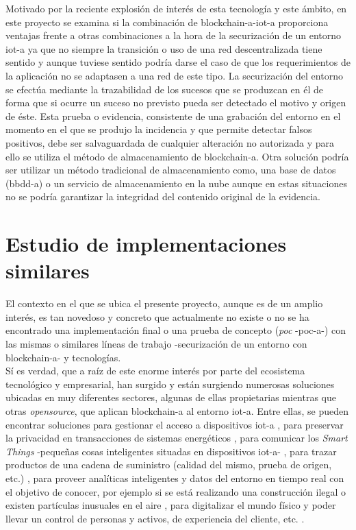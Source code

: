 \documentclass[12pt,a4paper, twoside]{report}
\begin{document}
	Motivado por la reciente explosión de interés de esta tecnología y este ámbito, en este proyecto se examina si la combinación de \gls{blockchain-a}-\gls{iot-a} proporciona ventajas frente a otras combinaciones a la hora de la securización de un entorno \gls{iot-a} ya que no siempre la transición o uso de una red descentralizada tiene sentido y aunque tuviese sentido podría darse el caso de que los requerimientos de la aplicación no se adaptasen a una red de este tipo. La securización del entorno se efectúa mediante la trazabilidad de los sucesos que se produzcan en él de forma que si ocurre un suceso no previsto pueda ser detectado el motivo y origen de éste. Esta prueba o evidencia, consistente de una grabación del entorno en el momento en el que se produjo la incidencia y que permite detectar falsos positivos, debe ser salvaguardada de cualquier alteración no autorizada y para ello se utiliza el método de almacenamiento de \gls{blockchain-a}. Otra solución podría ser utilizar un método tradicional de almacenamiento como, una base de datos (\gls{bbdd-a}) o un servicio de almacenamiento en la nube aunque en estas situaciones no se podría garantizar la integridad del contenido original de la evidencia.
	
	\section{Estudio de implementaciones similares}
	
	El contexto en el que se ubica el presente proyecto, aunque es de un amplio interés, es tan novedoso y concreto que actualmente no existe o no se ha encontrado una implementación final o una prueba de concepto (\textit{\gls{poc}} -\gls{poc-a}-) con las mismas o similares líneas de trabajo -securización de un entorno con \gls{blockchain-a}- y tecnologías. \\
	
	Sí es verdad, que a raíz de este enorme interés por parte del ecosistema tecnológico y empresarial, han surgido y están surgiendo numerosas soluciones ubicadas en muy diferentes sectores, algunas de ellas propietarias mientras que otras \textit{\gls{opensource}}, que aplican \gls{blockchain-a} al entorno \gls{iot-a}. Entre ellas, se pueden encontrar soluciones para gestionar el acceso a dispositivos \gls{iot-a} \cite{blockchain:iot:novo}, para preservar la privacidad en transacciones de sistemas energéticos \cite{blockchain:iot:laszka}, para comunicar los \textit{Smart Things} -pequeñas cosas inteligentes situadas en dispositivos \gls{iot-a}- \cite{blockchain:iot:iost}, para trazar productos de una cadena de suministro (calidad del mismo, prueba de origen, etc.) \cite{blockchain:iot:ambrosus}, para proveer analíticas inteligentes y datos del entorno en tiempo real con el objetivo de conocer, por ejemplo si se está realizando una construcción ilegal o existen partículas inusuales en el aire \cite{blockchain:iot:nokia}, para digitalizar el mundo físico y poder llevar un control de personas y activos, de experiencia del cliente, etc. \cite{blockchain:iot:kontakt}.
	
\end{document}
